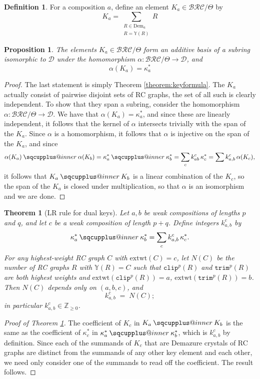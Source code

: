 \documentclass[a4paper,fleqn]{cas-sc}
\makeatletter
\newcommand{\sqcupplus@inner}[2]{%
  \vcenter{\hbox{\ooalign{%
    \hfil$\m@th#1\sqcup$\hfil\cr
    \hfil\raisebox{0.15ex}{$\m@th#1\scriptscriptstyle+$}\hfil\cr
  }}}%
}
\newcommand{\sqcupplus}{\mathbin{\mathpalette\sqcupplus@inner\relax}}
\newtheorem{proposition}[lemma]{Proposition}
\newtheorem{theorem}{Theorem}[section]
\theoremstyle{definition}
\newtheorem{definition}[lemma]{Definition}
\theoremstyle{remark}
\numberwithin{equation}{subsection}
\newcommand{\trm}{\mathtt{trim}}
\newcommand{\clp}{\mathtt{clip}}
\newcommand{\BRC}{\mathcal{BRC}}
\newcommand{\dcoma}{\mathcal{D}}
\makeatother
\begin{document}
\begin{definition}
For a composition $a$, define  an element $K_a\in\BRC/\Theta$ by
$$K_a =\sum_{\substack{R\in\mathrm{Dem}_a\\ R=\mathbb{Y}(R)}} R$$
\end{definition}

\begin{proposition}
The elements $K_a\in\BRC/\Theta$ form an additive basis of a subring isomorphic to $\dcoma$ under the homomorphism $\alpha:\BRC/\Theta\to \dcoma$, and 
$$\alpha(K_a) = \kappa_a^*$$
\end{proposition}
\begin{proof}
The last statement is simply Theorem \ref{theorem:keyformula}. The $K_a$ actually consist of pairwise disjoint sets of RC graphs, the set of all such is clearly independent. To show that they span a subring, consider the homomorphism $\alpha:\BRC/\Theta\to \dcoma$. We have that $\alpha(K_a)=\kappa_a^*$, and since these are linearly independent, it follows that the kernel of $\alpha$ intersects trivially with the span of the $K_a$. Since $\alpha$ is a homomorphism, it follows that $\alpha$ is injective on the span of the $K_a$, and since 
$$\alpha(K_a)\sqcupplus\alpha(K_b) = \kappa_a^*\sqcupplus\kappa_b^*=\sum_{c}k_{ab}^c\,\kappa_c^*=\sum k_{a,b}^c\,\alpha(K_c),$$ 
it follows that $K_a\sqcupplus K_b$ is a linear combination of the $K_c$, so the span of the $K_a$ is closed under multiplication, so that $\alpha$ is an isomorphism and we are done.
\end{proof}

\begin{theorem}[LR rule for dual keys]\label{theorem:LRkey}
Let $a,b$ be weak compositions of lengths $p$ and $q$, and let $c$ be a weak composition of length $p+q$. Define integers $k_{a,b}^c$ by
$$\kappa_a^* \sqcupplus \kappa_b^* = \sum_{c} k_{a,b}^c\,\kappa_c^*.$$
For any highest-weight RC graph $C$ with $\mathrm{extwt}(C)=c$, let $N(C)$ be the number of RC graphs $R$ with $\mathbb{Y}(R)=C$ such that $\clp^p(R)$ and $\trm^p(R)$ are both highest weights and $\mathrm{extwt}(\clp^p(R)) = a$, $\mathrm{extwt}(\trm^p(R)) = b$. Then $N(C)$ depends only on $(a,b,c)$, and
$$k_{a,b}^c \;=\; N(C);$$
in particular $k_{a,b}^c\in\mathbb{Z}_{\geq 0}$.
\end{theorem}

\begin{proof}[Proof of Theorem \ref{theorem:LRkey}]
  The coefficient of $K_c$ in $K_a\sqcupplus K_b$ is the same as the coefficient of $\kappa_c^*$ in $\kappa_a^*\sqcupplus\kappa_b^*$, which is $k_{a,b}^c$ by definition. Since each of the summands of $K_c$ that are Demazure crystals of RC graphs are distinct from the summands of any other key element and each other, we need only consider one of the summands to read off the coefficient. The result follows.
\end{proof}
\end{document}
